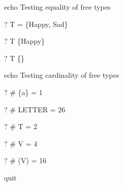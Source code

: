 echo     Testing equality of free types
\begin{zed} \vdash?  T = \{Happy, Sad\} \end{zed}
\begin{zed} \vdash?  T \neq \{Happy\} \end{zed}
\begin{zed} \vdash?  T \neq \{\} \end{zed}


echo     Testing cardinality of free types
\begin{zed} \vdash?  \# \{a\} = 1 \end{zed}
\begin{zed} \vdash?  \# LETTER = 26 \end{zed}
\begin{zed} \vdash?  \# T = 2 \end{zed}

\begin{zed} \vdash?  \# V = 4 \end{zed}
\begin{zed} \vdash?  \# (\power V) = 16 \end{zed}

quit
